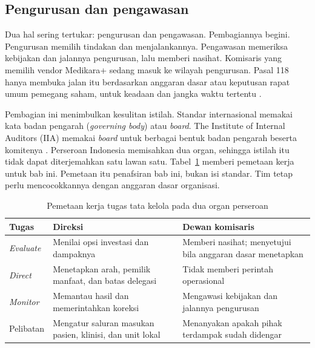 \subsection*{Pengurusan dan pengawasan}

Dua hal sering tertukar: pengurusan dan pengawasan. Pembagiannya begini. Pengurusan memilih
tindakan dan menjalankannya. Pengawasan memeriksa kebijakan dan jalannya pengurusan, lalu
memberi nasihat. Komisaris yang memilih vendor Medikara+ sedang masuk ke wilayah pengurusan.
Pasal 118 hanya membuka jalan itu berdasarkan anggaran dasar atau keputusan rapat umum
pemegang saham, untuk keadaan dan jangka waktu tertentu \cite{c02-uu40}.

Pembagian ini menimbulkan kesulitan istilah. Standar internasional memakai kata badan
pengarah (\textit{governing body}) atau \textit{board}. The Institute of Internal Auditors
(IIA) memakai \textit{board} untuk berbagai bentuk badan pengarah beserta komitenya
\cite{iia-tlm2026}. Perseroan Indonesia memisahkan dua organ, sehingga istilah itu tidak
dapat diterjemahkan satu lawan satu. Tabel~\ref{tab:ch02-pemetaan} memberi pemetaan kerja
untuk bab ini. Pemetaan itu penafsiran bab ini, bukan isi standar. Tim tetap perlu
mencocokkannya dengan anggaran dasar organisasi.

\begin{table}[!htb]
  \centering\small
  \caption{Pemetaan kerja tugas tata kelola pada dua organ perseroan}
  \label{tab:ch02-pemetaan}
  \begin{tabularx}{\textwidth}{|>{\raggedright\arraybackslash}p{}|>{\raggedright\arraybackslash}X|>{\raggedright\arraybackslash}X|}
    \hline
    \textbf{Tugas} & \textbf{Direksi} & \textbf{Dewan komisaris} \\ \hline
    \textit{Evaluate} & Menilai opsi investasi dan dampaknya & Memberi nasihat; menyetujui
    bila anggaran dasar menetapkan \\ \hline
    \textit{Direct} & Menetapkan arah, pemilik manfaat, dan batas delegasi & Tidak memberi
    perintah operasional \\ \hline
    \textit{Monitor} & Memantau hasil dan memerintahkan koreksi & Mengawasi kebijakan dan
    jalannya pengurusan \\ \hline
    Pelibatan & Mengatur saluran masukan pasien, klinisi, dan unit lokal & Menanyakan
    apakah pihak terdampak sudah didengar \\ \hline
  \end{tabularx}
\end{table}

